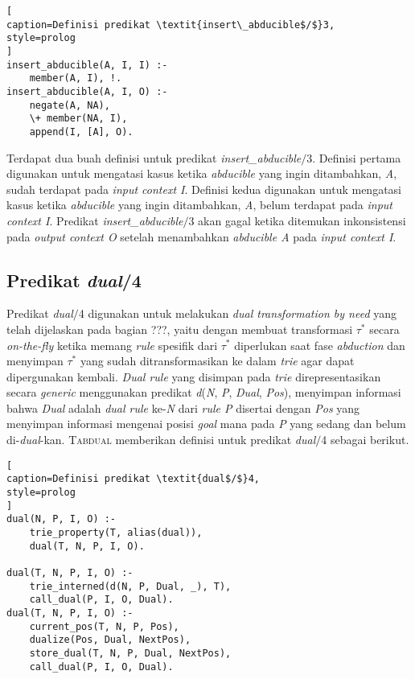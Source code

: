\begin{lstlisting}[
caption=Definisi predikat \textit{insert\_abducible$/$}3,
style=prolog
]
insert_abducible(A, I, I) :-
	member(A, I), !.
insert_abducible(A, I, O) :-
	negate(A, NA),
	\+ member(NA, I),
	append(I, [A], O).
\end{lstlisting}

Terdapat dua buah definisi untuk predikat \textit{insert\_abducible$/$}3. Definisi pertama digunakan untuk mengatasi kasus ketika \textit{abducible} yang ingin ditambahkan, \textit{A}, sudah terdapat pada \textit{input context I}. Definisi kedua digunakan untuk mengatasi kasus ketika \textit{abducible} yang ingin ditambahkan, \textit{A}, belum terdapat pada \textit{input context I}. Predikat \textit{insert\_abducible$/$}3 akan gagal ketika ditemukan inkonsistensi pada \textit{output context O} setelah menambahkan \textit{abducible A} pada \textit{input context I}.

\subsection{Predikat \textit{dual}/4}

Predikat \textit{dual$/$}4 digunakan untuk melakukan \textit{dual transformation by need} yang telah dijelaskan pada bagian ???, yaitu dengan membuat transformasi $\tau^*$ secara \textit{on-the-fly} ketika memang \textit{rule} spesifik dari $\tau^*$ diperlukan saat fase \textit{abduction} dan menyimpan $\tau^*$ yang sudah ditransformasikan ke dalam \textit{trie} agar dapat dipergunakan kembali. \textit{Dual rule} yang disimpan pada \textit{trie} direpresentasikan secara \textit{generic} menggunakan predikat \textit{d}(\textit{N}, \textit{P}, \textit{Dual}, \textit{Pos}), menyimpan informasi bahwa \textit{Dual} adalah \textit{dual rule} ke-\textit{N} dari \textit{rule P} disertai dengan \textit{Pos} yang menyimpan informasi mengenai posisi \textit{goal} mana pada \textit{P} yang sedang dan belum di-\textit{dual}-kan. \textsc{Tabdual} memberikan definisi untuk predikat \textit{dual$/$}4 sebagai berikut.
\\

\begin{lstlisting}[
caption=Definisi predikat \textit{dual$/$}4,
style=prolog
]
dual(N, P, I, O) :-
	trie_property(T, alias(dual)),
	dual(T, N, P, I, O).
	
dual(T, N, P, I, O) :-
	trie_interned(d(N, P, Dual, _), T),
	call_dual(P, I, O, Dual).
dual(T, N, P, I, O) :-
	current_pos(T, N, P, Pos),
	dualize(Pos, Dual, NextPos),
	store_dual(T, N, P, Dual, NextPos),
	call_dual(P, I, O, Dual).
\end{lstlisting}

